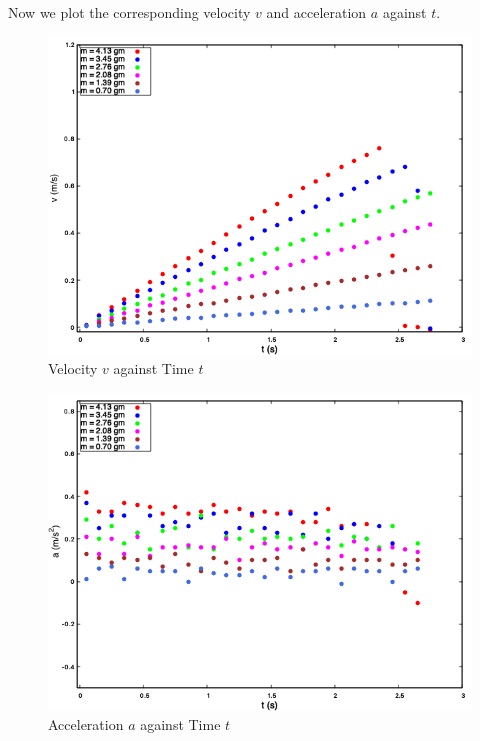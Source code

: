 \documentclass[11pt, a4paper, abstract=true]{scrartcl}
\begin{document}
\newpage

Now we plot the corresponding velocity \(v\) and acceleration \(a\) against \(t\).
\begin{figure}[H]
    \centering
    \includegraphics[scale=0.60]{assets/vt_fixed_mass.png}
    \caption{Velocity \(v\) against Time \(t\)}
\end{figure}
\begin{figure}[H]
    \centering
    \includegraphics[scale=0.60]{assets/at_fixed_mass.png}
    \caption{Acceleration \(a\) against Time \(t\)}
\end{figure}

\newpage
\end{document}
